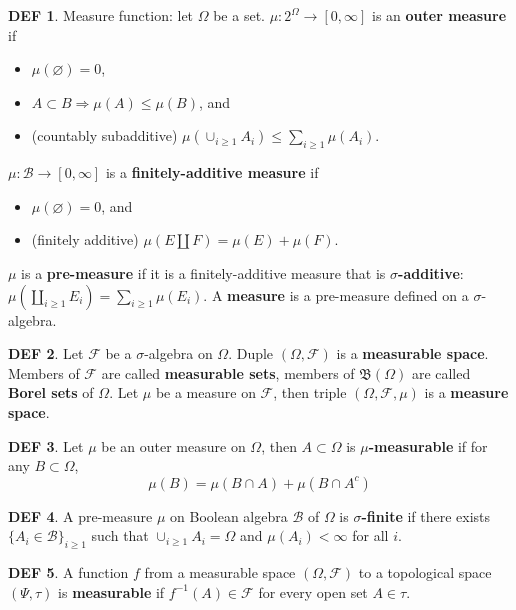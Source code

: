 \documentclass[hidelinks,11pt]{article}
\theoremstyle{definition}
\newtheorem*{defin}{DEF}
\theoremstyle{dotless}
\theoremstyle{remark}
\DeclareMathOperator{\1}{\mathbf{1}}
\begin{document}
\begin{defin}
Measure function: let $\Omega$ be a set.\newline
$\mu:2^\Omega\to[0,\infty]$ is an \textbf{outer measure} if\begin{itemize}
    \item $\mu(\varnothing)=0$,
    \item $A\subset B\Rightarrow\mu(A)\leq\mu(B)$, and
    \item (countably subadditive) $\mu(\cup_{i\geq1}A_i)\leq\sum_{i\geq1}\mu(A_i)$.
\end{itemize}
$\mu:\mathcal{B}\to[0,\infty]$ is a \textbf{finitely-additive measure} if\begin{itemize}
    \item $\mu(\varnothing)=0$, and
    \item (finitely additive) $\mu(E\amalg F)=\mu(E)+\mu(F)$.
\end{itemize}
$\mu$ is a \textbf{pre-measure} if it is a finitely-additive measure that is \textbf{$\sigma$-additive}: $\mu(\amalg_{i\geq1}E_i)=\sum_{i\geq1}\mu(E_i)$.\newline
A \textbf{measure} is a pre-measure defined on a $\sigma$-algebra.
\end{defin}

\begin{defin}
Let $\mathcal{F}$ be a $\sigma$-algebra on $\Omega$. Duple $(\Omega,\mathcal{F})$ is a \textbf{measurable space}. Members of $\mathcal{F}$ are called \textbf{measurable sets}, members of $\mathfrak{B}(\Omega)$ are called \textbf{Borel sets} of $\Omega$. Let $\mu$ be a measure on $\mathcal{F}$, then triple $(\Omega,\mathcal{F},\mu)$ is a \textbf{measure space}.
\end{defin}

\begin{defin}
Let $\mu$ be an outer measure on $\Omega$, then $A\subset\Omega$ is \textbf{$\mu$-measurable} if for any $B\subset\Omega$,
\[\mu(B)=\mu(B\cap A)+\mu(B\cap A^c)\]
\end{defin}

\begin{defin}
A pre-measure $\mu$ on Boolean algebra $\mathcal{B}$ of $\Omega$ is \textbf{$\sigma$-finite} if there exists $\{A_i\in\mathcal{B}\}_{i\geq1}$ such that $\cup_{i\geq1}A_i=\Omega$ and $\mu(A_i)<\infty$ for all $i$.
\end{defin}

\begin{defin}
A function $f$ from a measurable space $(\Omega,\mathcal{F})$ to a topological space $(\Psi,\tau)$ is \textbf{measurable} if $f^{-1}(A)\in\mathcal{F}$ for every open set $A\in\tau$.
\end{defin}
\end{document}
